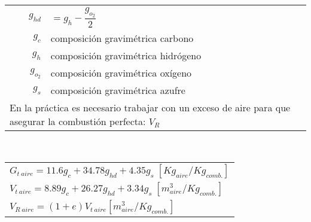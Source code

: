 \documentclass[11pt,a4paper]{article}
\begin{document}
\begin{cajita}
		
		
		
		
		
	

		\begin{multicols}{2}
			\begin{tabular}{r p{}}
				$g_{hd}$&$= g_{h} - \dfrac{g_{o_{2}}}{2}$\\
				$g_{c}$ &composición gravimétrica carbono\\
				$g_{h}$ &composición gravimétrica hidrógeno\\
				$g_{o_{2}}$ &composición gravimétrica oxígeno\\
				$g_{s}$ &composición gravimétrica azufre\\
				\multicolumn{2}{l}{En la práctica es necesario trabajar con un exceso de aire para que asegurar la combustión perfecta: $V_R$}
			\end{tabular}\\
			\renewcommand{\arraystretch}{1.5}
			\begin{tabular}{l}
				$G_{t \ aire} = 11.6 g_{c} + 34.78 g_{hd} +4.35 g_{s} \; [Kg_{aire}/Kg_{comb.}]$\\
				$V_{t \ aire} = 8.89 g_{c} + 26.27 g_{hd} + 3.34 g_{s} \; [m^{3}_{aire}/Kg_{comb.}]$\\
				$V_{R \ aire} = (1+e) V_{t \ aire} [m^{3}_{aire}/Kg_{comb.}]$\\
			\end{tabular}
			



		\end{multicols}







\end{cajita}
\end{document}
